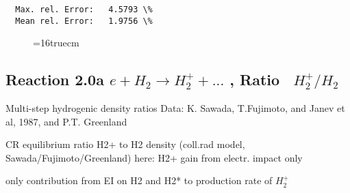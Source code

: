 \documentclass[12pt,dvipdfmx]{article}
\begin{document}
\begin{small}
\begin{verbatim}
  Max. rel. Error:   4.5793 \%
  Mean rel. Error:   1.9756 \%

\end{verbatim}\end{small}
\begin{figure} \label{7.2e}
\epsfxsize=16truecm
\end{figure}
\newpage

\subsection{
Reaction 2.0a  $e + H_2 \rightarrow H_2^+ + ... $ , Ratio \ $H_2^+/H_2$
}

 Multi-step hydrogenic density ratios
 Data: K. Sawada, T.Fujimoto, \cite{kn:Sawada} and Janev et al, 1987, and P.T. Greenland


  CR equilibrium ratio H2+ to H2 density
  (coll.rad model, Sawada/Fujimoto/Greenland)
 here:  H2+ gain from electr. impact only

  only contribution from  EI on H2 and H2* to production rate of $H_2^+$
\end{document}
